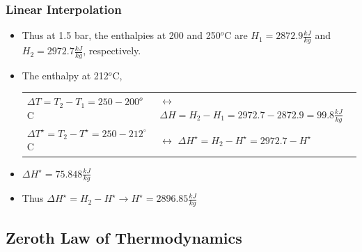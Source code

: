 \documentclass[10pt,compress]{beamer}
\begin{document}

\begin{frame}
  \frametitle{Linear Interpolation}
\noindent
\begin{itemize}
\item <2-> Thus at 1.5 bar, the enthalpies at 200 and 250$^{o}$C are $H_{1}=2872.9\frac{kJ}{kg}$ and $H_{2}=2972.7\frac{kJ}{kg}$, respectively.
\item <3-> The enthalpy at 212$^{o}$C,
\begin{tabular}{ l l }
\scriptsize $\Delta T=T_{2}-T_{1}=250-200^{o}$C   & \scriptsize $\longleftrightarrow$  $\Delta H=H_{2}-H_{1}=2972.7-2872.9=99.8\frac{kJ}{kg}$ \\
\scriptsize $\Delta T^{\star} = T_{2} - T^{\star}= 250 - 212^{\circ}$C & \scriptsize $\longleftrightarrow$  $\Delta H^{\star}= H_{2} - H^{\star}= 2972.7 - H^{\star}$\\    
\end{tabular}
\item <4-> $\Delta H^{\star}=75.848\frac{kJ}{kg}$ 
\item <5-> Thus $\Delta H^{\star}= H_{2}-H^{\star} \longrightarrow H^{\star}=2896.85\frac{kJ}{kg}$
\end{itemize}

\end{frame}


\subsection{Zeroth Law of Thermodynamics}
\end{document}
